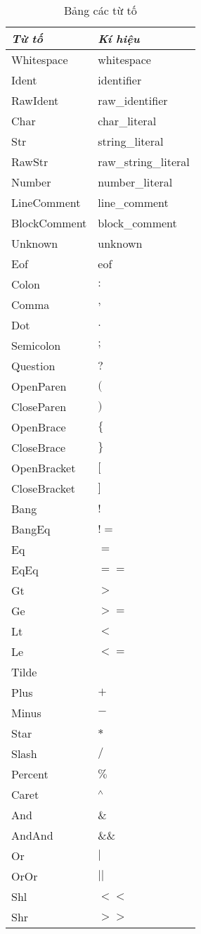 \begin{longtable}{|p{4cm}| p{4cm} |}
    \caption{Bảng các từ tố} \\
\hline
\textbf{\textit{Từ tố}} & \textbf{\textit{Kí hiệu}} \\
\hline
Whitespace & whitespace \\
\hline
Ident & identifier \\
\hline
RawIdent & raw\_identifier \\
\hline
Char & char\_literal \\
\hline
Str & string\_literal \\
\hline
RawStr & raw\_string\_literal \\
\hline
Number & number\_literal \\
\hline
LineComment & line\_comment \\
\hline
BlockComment & block\_comment \\
\hline
Unknown & unknown \\
\hline
Eof & eof \\
\hline
Colon & $:$ \\
\hline
Comma & $,$ \\
\hline
Dot & $.$ \\
\hline
Semicolon & $;$ \\
\hline
Question & $?$ \\
\hline
OpenParen & $($ \\
\hline
CloseParen & $)$ \\
\hline
OpenBrace & $\{$ \\
\hline
CloseBrace & $\}$ \\
\hline
OpenBracket & $[$ \\
\hline
CloseBracket & $]$ \\
\hline
Bang & $!$ \\
\hline
BangEq & $!=$ \\
\hline
Eq & $=$ \\
\hline
EqEq & $==$ \\
\hline
Gt & $>$ \\
\hline
Ge & $>=$ \\
\hline
Lt & $<$ \\
\hline
Le & $<=$ \\
\hline
Tilde & $~$ \\
\hline
Plus & $+$ \\
\hline
Minus & $-$ \\
\hline
Star & $*$ \\
\hline
Slash & $/$ \\
\hline
Percent & $\%$ \\
\hline
Caret & $\textsuperscript{$\wedge$}$ \\
\hline
And & $\&$ \\
\hline
AndAnd & $\&\&$ \\
\hline
Or & $|$ \\
\hline
OrOr & $||$ \\
\hline
Shl & $<<$ \\
\hline
Shr & $>>$ \\
\hline
\end{longtable}
